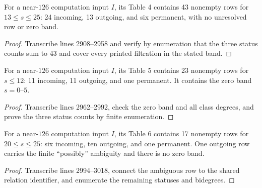 \begin{proposition}
  \label{data:table-s124-high}
  \notready
  For a near-$126$ computation input $I$, its Table 4 contains 43 nonempty rows
  for $13\le s\le25$: 24 incoming, 13 outgoing, and six permanent, with no
  unresolved row or zero band.
\end{proposition}

\begin{proof}
  Transcribe lines 2908--2958 and verify by enumeration that the three status
  counts sum to 43 and cover every printed filtration in the stated band.
\end{proof}

\begin{proposition}
  \label{data:table-s124-low}
  \notready
  For a near-$126$ computation input $I$, its Table 5 contains 23 nonempty rows
  for $s\le12$: 11 incoming, 11 outgoing, and one permanent.  It contains the
  zero band $s=0$--$5$.
\end{proposition}

\begin{proof}
  Transcribe lines 2962--2992, check the zero band and all class degrees, and
  prove the three status counts by finite enumeration.
\end{proof}

\begin{proposition}
  \label{data:table-s125-high}
  \notready
  For a near-$126$ computation input $I$, its Table 6 contains 17 nonempty rows
  for $20\le s\le25$: six incoming, ten outgoing, and one permanent.  One
  outgoing row carries the finite ``possibly'' ambiguity and there is no zero
  band.
\end{proposition}

\begin{proof}
  Transcribe lines 2994--3018, connect the ambiguous row to the shared relation
  identifier, and enumerate the remaining statuses and bidegrees.
\end{proof}

